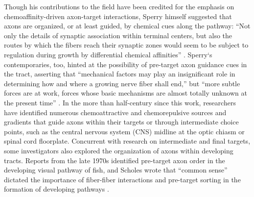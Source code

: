 Though his contributions to the field have been credited for the emphasis on chemoaffinity-driven axon-target interactions, Sperry himself suggested that axons are organized, or at least guided, by chemical cues along the pathway: ``Not only the details of synaptic association within terminal centers, but also the routes by which the fibers reach their synaptic zones would seem to be subject to regulation during growth by differential chemical affinities'' \cite{attardi1963preferential}.
Sperry`s contemporaries, too, hinted at the possibility of pre-target axon guidance cues in the tract, asserting that ``mechanical factors may play an insignificant role in determining how and where a growing nerve fiber shall end,'' but ``more subtle forces are at work, forces whose basic mechanisms are almost totally unknown at the present time'' \cite{barnard1956study}.
In the more than half-century since this work, researchers have identified numerous chemoattractive and chemorepulsive sources and gradients that guide axons within their targets or through intermediate choice points, such as the central nervous system (CNS) midline at the optic chiasm or spinal cord floorplate.
Concurrent with research on intermediate and final targets, some investigators also explored the organization of axons within developing tracts.
Reports from the late 1970s identified pre-target axon order in the developing visual pathway of fish, and Scholes wrote that ``common sense'' dictated the importance of fiber-fiber interactions and pre-target sorting in the formation of developing pathways \cite{cook1977multiple,scholes1979nerve}.